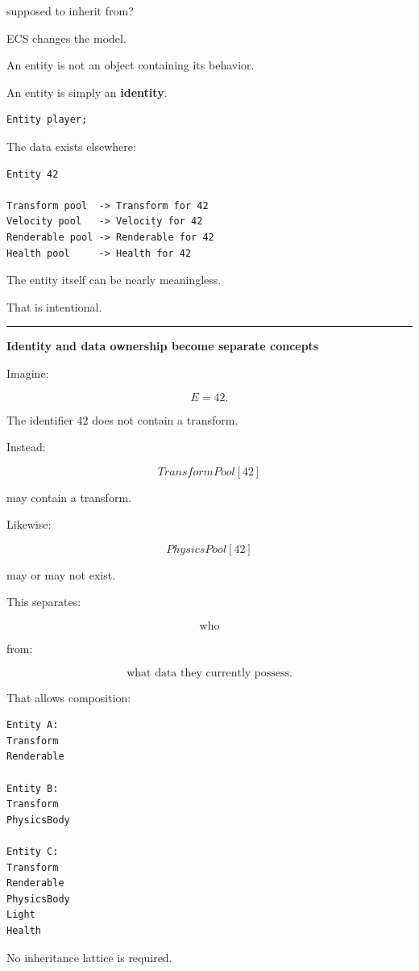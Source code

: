supposed to inherit from?

ECS changes the model.

An entity is not an object containing its behavior.

An entity is simply an \textbf{identity}.

\begin{verbatim}
Entity player;
\end{verbatim}

The data exists elsewhere:

\begin{verbatim}
Entity 42

Transform pool  -> Transform for 42
Velocity pool   -> Velocity for 42
Renderable pool -> Renderable for 42
Health pool     -> Health for 42
\end{verbatim}

The entity itself can be nearly meaningless.

That is intentional.

\begin{center}\rule{0.5\linewidth}{0.5pt}\end{center}

\textbf{Identity and data ownership become separate concepts}

Imagine:

\[
E=42.
\]

The identifier 42 does not contain a transform.

Instead:

\[
TransformPool[42]
\]

may contain a transform.

Likewise:

\[
PhysicsPool[42]
\]

may or may not exist.

This separates:

\[
\boxed{\text{who}}
\]

from:

\[
\boxed{\text{what data they currently possess}}.
\]

That allows composition:

\begin{verbatim}
Entity A:
Transform
Renderable

Entity B:
Transform
PhysicsBody

Entity C:
Transform
Renderable
PhysicsBody
Light
Health
\end{verbatim}

No inheritance lattice is required.

